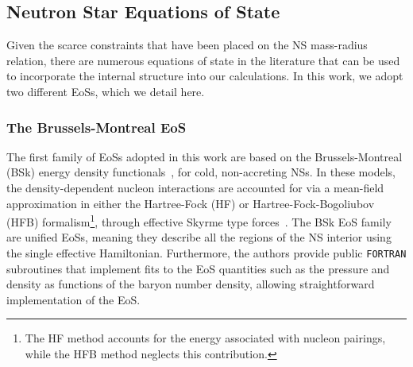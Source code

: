 \subsection{Neutron Star Equations of State}

Given the scarce constraints that have been placed on the NS mass-radius relation, there are numerous equations of state in the literature that can be used to incorporate the internal structure into our calculations. In this work, we adopt two different EoSs, which we detail here. 

\subsubsection{The Brussels-Montreal EoS}
The first family of EoSs adopted in this work are based on the Brussels-Montreal (BSk) energy density functionals~\cite{Chamel:2009yx_FurtherexplorationsSkyrmeHartreeFockBogoliubov, Goriely:2010bm_FurtherexplorationsSkyrmeHartreeFockBogoliubov, Pearson:2011zz_jun_Propertiesoutercrust, Pearson:2012hz_Innercrustneutron, Potekhin:2013qqa_Analyticalrepresentationsunified, Pearson:2018tkr_Unifiedequationsstate}, for cold, non-accreting NSs. In these models, the density-dependent nucleon interactions are accounted for via a mean-field approximation in either the Hartree-Fock (HF) or Hartree-Fock-Bogoliubov (HFB) formalism\footnote{The HF method accounts for the energy associated with nucleon pairings, while the HFB method neglects this contribution.}, through effective Skyrme type forces~\cite{Bender:2003jk_Selfconsistentmeanfieldmodels, Stone:2006fn_Skyrmeinteractionfinite}. The BSk EoS family are unified EoSs, meaning they describe all the regions of the NS interior using the single effective Hamiltonian. Furthermore, the authors provide public \texttt{FORTRAN} subroutines that implement fits to the EoS quantities such as the pressure and density as functions of the baryon number density, allowing straightforward implementation of the EoS. 

